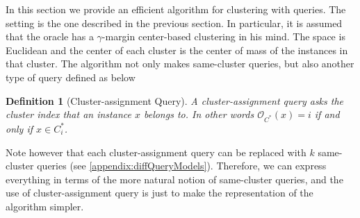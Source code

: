 \documentclass{article}
\newcommand{\mc}{\mathcal}
\newtheorem{definition}[theorem]{Definition}
\begin{document}
In this section we provide an efficient algorithm for clustering with queries. The setting is the one described in the previous section. In particular, it is assumed that the oracle has a $\gamma$-margin center-based clustering in his mind. The space is Euclidean and the center of each cluster is the center of mass of the instances in that cluster. The algorithm not only makes same-cluster queries, but also another type of query defined as below%


\begin{definition}[Cluster-assignment Query]
A cluster-assignment query asks the cluster index that an instance $x$ belongs to. In other words ${\mc O_{C^*}}(x) = i$ if and only if $x \in C^*_i$.
%
\end{definition}

Note however that each cluster-assignment query can be replaced with $k$ same-cluster queries (see \ref{appendix:diffQueryModels}). Therefore, we can express everything in terms of the more natural notion of same-cluster queries, and the use of cluster-assignment query is just to make the representation of the algorithm simpler.






\end{document}
